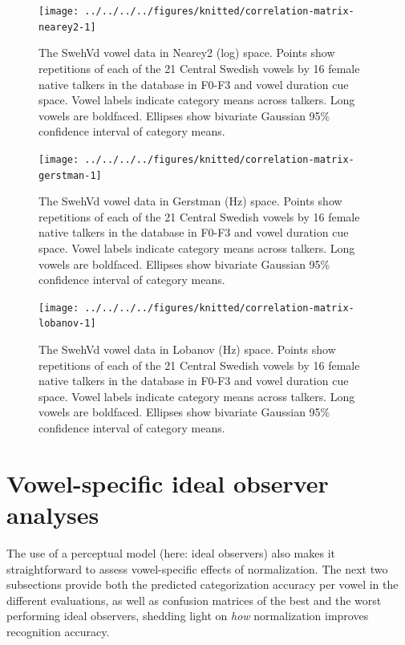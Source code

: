 \documentclass[utf8]{frontiers_suppmat} %
\begin{document}
\begin{figure}[H]
\texttt{[image: ../../../../figures/knitted/correlation-matrix-nearey2-1]} \caption{The SwehVd vowel data in Nearey2 (log) space. Points show repetitions of each of the 21 Central Swedish vowels by 16 female native talkers in the database in F0-F3 and vowel duration cue space. Vowel labels indicate category means across talkers. Long vowels are boldfaced. Ellipses show bivariate Gaussian 95\% confidence interval of category means.}\label{fig:correlation-matrix-nearey2}
\end{figure}



\begin{figure}[H]
\texttt{[image: ../../../../figures/knitted/correlation-matrix-gerstman-1]} \caption{The SwehVd vowel data in Gerstman (Hz) space. Points show repetitions of each of the 21 Central Swedish vowels by 16 female native talkers in the database in F0-F3 and vowel duration cue space. Vowel labels indicate category means across talkers. Long vowels are boldfaced. Ellipses show bivariate Gaussian 95\% confidence interval of category means.}\label{fig:correlation-matrix-gerstman}
\end{figure}



\begin{figure}[H]
\texttt{[image: ../../../../figures/knitted/correlation-matrix-lobanov-1]} \caption{The SwehVd vowel data in Lobanov (Hz) space. Points show repetitions of each of the 21 Central Swedish vowels by 16 female native talkers in the database in F0-F3 and vowel duration cue space. Vowel labels indicate category means across talkers. Long vowels are boldfaced. Ellipses show bivariate Gaussian 95\% confidence interval of category means.}\label{fig:correlation-matrix-lobanov}
\end{figure}

\newpage

\hypertarget{sec:vowel-specific}{%
\section{Vowel-specific ideal observer analyses}\label{sec:vowel-specific}}

The use of a perceptual model (here: ideal observers) also makes it straightforward to assess vowel-specific effects of normalization. The next two subsections provide both the predicted categorization accuracy per vowel in the different evaluations, as well as confusion matrices of the best and the worst performing ideal observers, shedding light on \emph{how} normalization improves recognition accuracy.
\end{document}
